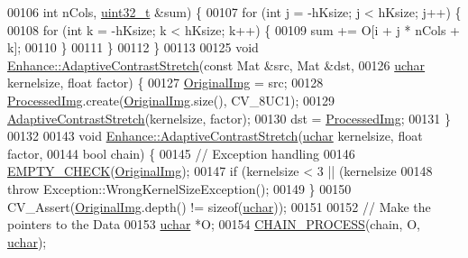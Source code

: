 \begin{DoxyCode}
00106                                               \textcolor{keywordtype}{int} nCols, \hyperlink{_soil_math_types_8h_a435d1572bf3f880d55459d9805097f62}{uint32\_t} &sum) \{
00107   \textcolor{keywordflow}{for} (\textcolor{keywordtype}{int} j = -hKsize; j < hKsize; j++) \{
00108     \textcolor{keywordflow}{for} (\textcolor{keywordtype}{int} k = -hKsize; k < hKsize; k++) \{
00109       sum += O[i + j * nCols + k];
00110     \}
00111   \}
00112 \}
00113 
00125 \textcolor{keywordtype}{void} \hyperlink{class_vision_1_1_enhance_a7aa0dfb4808ffc7abddd7fe4e30f6601}{Enhance::AdaptiveContrastStretch}(\textcolor{keyword}{const} Mat &src, Mat &dst,
00126                                       \hyperlink{_soil_math_types_8h_a65f85814a8290f9797005d3b28e7e5fc}{uchar} kernelsize, \textcolor{keywordtype}{float} factor) \{
00127   \hyperlink{class_vision_1_1_image_processing_a77c370dab270158a4e9c634e2d3f48e7}{OriginalImg} = src;
00128   \hyperlink{class_vision_1_1_image_processing_aa7d65742882cd1b2a1e4e9cb68809211}{ProcessedImg}.create(\hyperlink{class_vision_1_1_image_processing_a77c370dab270158a4e9c634e2d3f48e7}{OriginalImg}.size(), CV\_8UC1);
00129   \hyperlink{class_vision_1_1_enhance_a7aa0dfb4808ffc7abddd7fe4e30f6601}{AdaptiveContrastStretch}(kernelsize, factor);
00130   dst = \hyperlink{class_vision_1_1_image_processing_aa7d65742882cd1b2a1e4e9cb68809211}{ProcessedImg};
00131 \}
00132 
00143 \textcolor{keywordtype}{void} \hyperlink{class_vision_1_1_enhance_a7aa0dfb4808ffc7abddd7fe4e30f6601}{Enhance::AdaptiveContrastStretch}(\hyperlink{_soil_math_types_8h_a65f85814a8290f9797005d3b28e7e5fc}{uchar} kernelsize, \textcolor{keywordtype}{float} factor,
00144                                       \textcolor{keywordtype}{bool} chain) \{
00145   \textcolor{comment}{// Exception handling}
00146   \hyperlink{_image_processing_8h_a27c4e53b88a0f9f2c097add555131056}{EMPTY\_CHECK}(\hyperlink{class_vision_1_1_image_processing_a77c370dab270158a4e9c634e2d3f48e7}{OriginalImg});
00147   \textcolor{keywordflow}{if} (kernelsize < 3 || (kernelsize %
00148     \textcolor{keywordflow}{throw} Exception::WrongKernelSizeException();
00149   \}
00150   CV\_Assert(\hyperlink{class_vision_1_1_image_processing_a77c370dab270158a4e9c634e2d3f48e7}{OriginalImg}.depth() != \textcolor{keyword}{sizeof}(\hyperlink{_soil_math_types_8h_a65f85814a8290f9797005d3b28e7e5fc}{uchar}));
00151 
00152   \textcolor{comment}{// Make the pointers to the Data}
00153   \hyperlink{_soil_math_types_8h_a65f85814a8290f9797005d3b28e7e5fc}{uchar} *O;
00154   \hyperlink{_image_processing_8h_a6e6f0183cb53c76ef458d4fd34e07bcd}{CHAIN\_PROCESS}(chain, O, \hyperlink{_soil_math_types_8h_a65f85814a8290f9797005d3b28e7e5fc}{uchar});

\end{DoxyCode}
